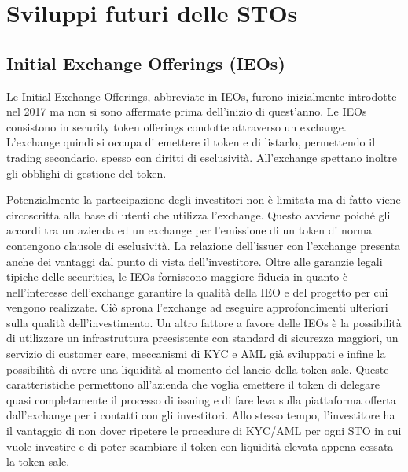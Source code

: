 \chapter{Sviluppi futuri delle STOs}
\section{Initial Exchange Offerings (IEOs)}
Le Initial Exchange Offerings, abbreviate in IEOs, furono inizialmente introdotte nel 2017 ma non si sono affermate prima dell'inizio di quest'anno. Le IEOs consistono in security token offerings condotte attraverso un exchange. L'exchange quindi si occupa di emettere il token e di listarlo, permettendo il trading secondario, spesso con diritti di esclusività. All'exchange spettano inoltre gli obblighi di gestione del token. 

Potenzialmente la partecipazione degli investitori non è limitata ma di fatto viene circoscritta alla base di utenti che utilizza l'exchange. Questo avviene poiché gli accordi tra un azienda ed un exchange per l'emissione di un token di norma contengono clausole di esclusività. 
La relazione dell'issuer con l'exchange presenta anche dei vantaggi dal punto di vista dell'investitore. Oltre alle garanzie legali tipiche delle securities, le IEOs forniscono maggiore fiducia in quanto è nell'interesse dell'exchange garantire la qualità della IEO e del progetto per cui vengono realizzate. Ciò sprona l'exchange ad eseguire approfondimenti ulteriori sulla qualità dell'investimento. Un altro fattore a favore delle IEOs è la possibilità di utilizzare un infrastruttura preesistente con standard di sicurezza maggiori, un servizio di customer care, meccanismi di KYC e AML già sviluppati e infine la possibilità di avere una liquidità al momento del lancio della token sale. 
Queste caratteristiche permettono all'azienda che voglia emettere il token di delegare quasi completamente il processo di issuing e di fare leva sulla piattaforma offerta dall'exchange per i contatti con gli investitori. Allo stesso tempo, l'investitore ha il vantaggio di non dover ripetere le procedure di KYC/AML per ogni STO in cui vuole investire e di poter scambiare il token con liquidità elevata appena cessata la token sale.

